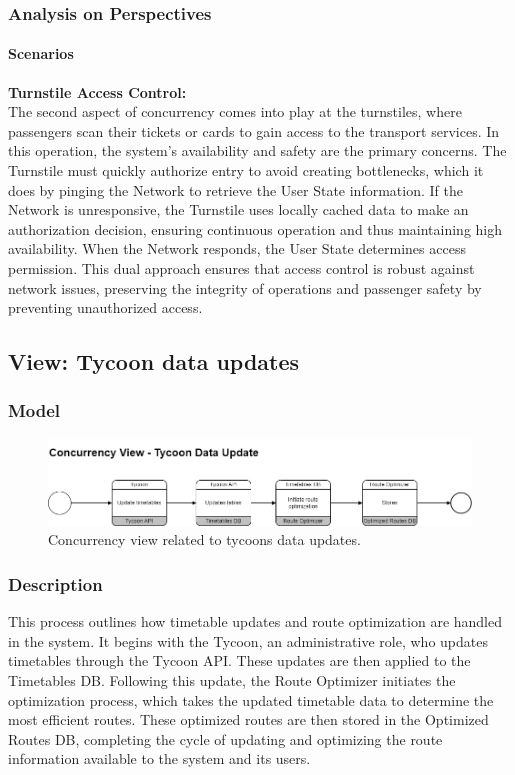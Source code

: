 \subsubsection{Analysis on Perspectives}
\paragraph{Scenarios}

\scenarioOneConcurrency
\scenarioTwoConcurrency
\noindent \textbf{Turnstile Access Control:} \\
The second aspect of concurrency comes into play at the turnstiles, where passengers scan their tickets or cards to gain access to the transport services. In this operation, the system's availability and safety are the primary concerns. The Turnstile must quickly authorize entry to avoid creating bottlenecks, which it does by pinging the Network to retrieve the User State information. If the Network is unresponsive, the Turnstile uses locally cached data to make an authorization decision, ensuring continuous operation and thus maintaining high availability. When the Network responds, the User State determines access permission. This dual approach ensures that access control is robust against network issues, preserving the integrity of operations and passenger safety by preventing unauthorized access. \\
\subsection{View: Tycoon data updates}
\subsubsection{Model}

\begin{figure}[H]
    \centering
    \includegraphics[width=\textwidth]{drawings/views_final_version/concurrency_view_3.png}
    \caption{Concurrency view related to tycoons data updates.}
    \label{fig:concurrency_view_3}
\end{figure}

\subsubsection{Description}
This process outlines how timetable updates and route optimization are handled in the system. It begins with the Tycoon, an administrative role, who updates timetables through the Tycoon API. These updates are then applied to the Timetables DB. Following this update, the Route Optimizer initiates the optimization process, which takes the updated timetable data to determine the most efficient routes. These optimized routes are then stored in the Optimized Routes DB, completing the cycle of updating and optimizing the route information available to the system and its users.

